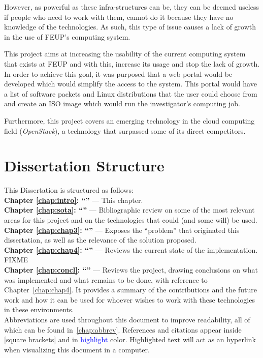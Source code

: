 However, as powerful as these infra-structures can be, they can be deemed useless if people who need to work with them, cannot do it because they have no knowledge of the technologies. As such, this type of issue causes a lack of growth in the use of FEUP's computing system.

This project aims at increasing the usability of the current computing system that exists at FEUP and with this, increase its usage and stop the lack of growth. In order to achieve this goal, it was purposed that a web portal would be developed which would simplify the access to the system. This portal would have a list of software packets and Linux distributions that the user could choose from and create an ISO image which would run the investigator's computing job.

Furthermore, this project covers an emerging technology in the cloud computing field (\textit{OpenStack}), a technology that surpassed some of its direct competitors.

\section{Dissertation Structure} \label{sec:structure}

This Dissertation is structured as follows:\\
\textbf{Chapter \ref{chap:intro}: ``'' } --- This chapter.\\
\textbf{Chapter \ref{chap:sota}: ``'' } --- Bibliographic review on some of the most relevant areas for this project and on the technologies that could (and some will) be used.\\
\textbf{Chapter \ref{chap:chap3}: ``'' } --- Exposes the ``problem'' that originated this dissertation, as well as the relevance of the solution proposed.\\
\textbf{Chapter \ref{chap:chap4}: ``'' } --- Reviews the current state of the implementation. FIXME\\
\textbf{Chapter \ref{chap:concl}: ``'' } --- Reviews the project, drawing conclusions on what was implemented and what remains to be done, with reference to Chapter~\ref{chap:chap4}. It provides a summary of the contributions and the future work and how it can be used for whoever wishes to work with these technologies in these environments.\\

Abbreviations are used throughout this document to improve readability, all of which can be found in~\ref{chap:abbrev}. References and citations appear inside [square brackets] and in \textcolor{blue}{highlight} color. Highlighted text will act as an hyperlink when visualizing this document in a computer.


